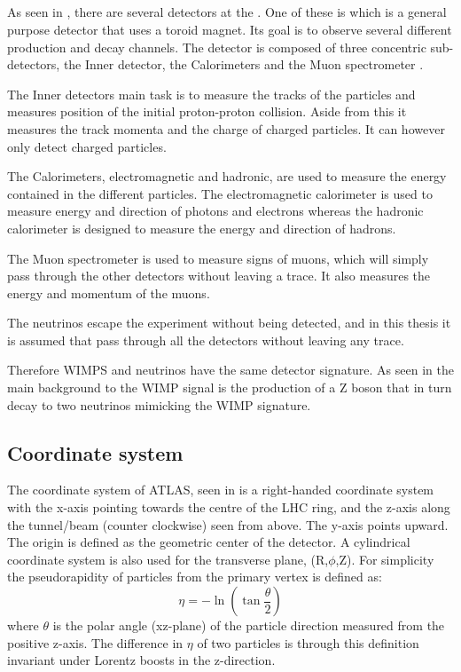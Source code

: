 \subsection{\abbrATLAS}\label{ATLAS}
As seen in , there are several detectors at the \abbrLHC. One of these is \abbrATLAS which is a general purpose detector that uses a toroid magnet. Its goal is to observe several different production and decay channels. The detector is composed of three concentric sub-detectors, the Inner detector, the Calorimeters and the Muon spectrometer \citep{1129811}.

The Inner detectors main task is to measure the tracks of the particles and measures position of the initial proton-proton collision. Aside from this it measures the track momenta and the charge of charged particles. It can however only detect charged particles.

The Calorimeters, electromagnetic and hadronic, are used to measure the energy contained in the different particles. The electromagnetic calorimeter is used to measure energy and direction of photons and electrons whereas the hadronic calorimeter is designed to measure the energy and direction of hadrons.

The Muon spectrometer is used to measure signs of muons, which will simply pass through the other detectors without leaving a trace. It also measures the energy and momentum of the muons.

The neutrinos escape the \abbrATLAS experiment without being detected, and in this thesis it is assumed that \abbrWIMPS pass through all the detectors without leaving any trace.

Therefore WIMPS and neutrinos have the same detector signature. As seen in  the main background to the WIMP signal is the production of a Z boson that in turn decay to two neutrinos mimicking the WIMP signature.
\subsection{Coordinate system}\label{sec:eo:subsec:coord}
The coordinate system of ATLAS, seen in  is a right-handed coordinate system with the x-axis pointing towards the centre of the LHC ring, and the z-axis along the tunnel/beam (counter clockwise) seen from above. The y-axis points upward. The origin is defined as the geometric center of the detector. A cylindrical coordinate system is also used for the transverse plane, (R,$\phi$,Z).
For simplicity the pseudorapidity of particles from the primary vertex is defined as:
\begin{equation}
\eta = - \ln( \tan\frac{\theta}{2})
\end{equation}
where $\theta$ is the polar angle (xz-plane) of the particle direction measured from the positive z-axis. The difference in $\eta$ of two particles is through this definition invariant under Lorentz boosts in the z-direction.


